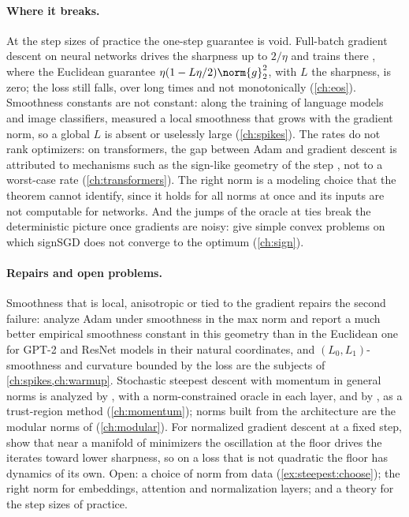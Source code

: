 \begin{refsection}
\paragraph{Where it breaks.} At the step sizes of practice the one-step guarantee is void. Full-batch gradient descent on neural networks drives the sharpness up to $2/\eta$ and trains there \parencite{CohenEtAl2021}, where the Euclidean guarantee $\eta(1-L\eta/2)\norm{g}_2^2$, with $L$ the sharpness, is zero; the loss still falls, over long times and not monotonically (\cref{ch:eos}). Smoothness constants are not constant: along the training of language models and image classifiers, \textcite{ZhangEtAl2020Clipping} measured a local smoothness that grows with the gradient norm, so a global $L$ is absent or uselessly large (\cref{ch:spikes}). The rates do not rank optimizers: on transformers, the gap between Adam and gradient descent is attributed to mechanisms such as the sign-like geometry of the step \parencite{KunstnerEtAl2023}, not to a worst-case rate (\cref{ch:transformers}). The right norm is a modeling choice that the theorem cannot identify, since it holds for all norms at once and its inputs are not computable for networks. And the jumps of the oracle at ties break the deterministic picture once gradients are noisy: \textcite{KarimireddyEtAl2019} give simple convex problems on which signSGD does not converge to the optimum (\cref{ch:sign}).

\paragraph{Repairs and open problems.} Smoothness that is local, anisotropic or tied to the gradient repairs the second failure: \textcite{XieEtAl2025} analyze Adam under smoothness in the max norm and report a much better empirical smoothness constant in this geometry than in the Euclidean one for GPT-2 and ResNet models in their natural coordinates, and $(L_0,L_1)$-smoothness \parencite{ZhangEtAl2020Clipping} and curvature bounded by the loss are the subjects of \cref{ch:spikes,ch:warmup}. Stochastic steepest descent with momentum in general norms is analyzed by \textcite{PethickEtAl2025}, with a norm-constrained oracle in each layer, and by \textcite{Kovalev2025}, as a trust-region method (\cref{ch:momentum}); norms built from the architecture are the modular norms of \textcite{LargeEtAl2024,BernsteinNewhouse2025} (\cref{ch:modular}). For normalized gradient descent at a fixed step, \textcite{AroraLiPanigrahi2022} show that near a manifold of minimizers the oscillation at the floor drives the iterates toward lower sharpness, so on a loss that is not quadratic the floor has dynamics of its own. Open: a choice of norm from data (\cref{ex:steepest:choose}); the right norm for embeddings, attention and normalization layers; and a theory for the step sizes of practice.


\end{refsection}
